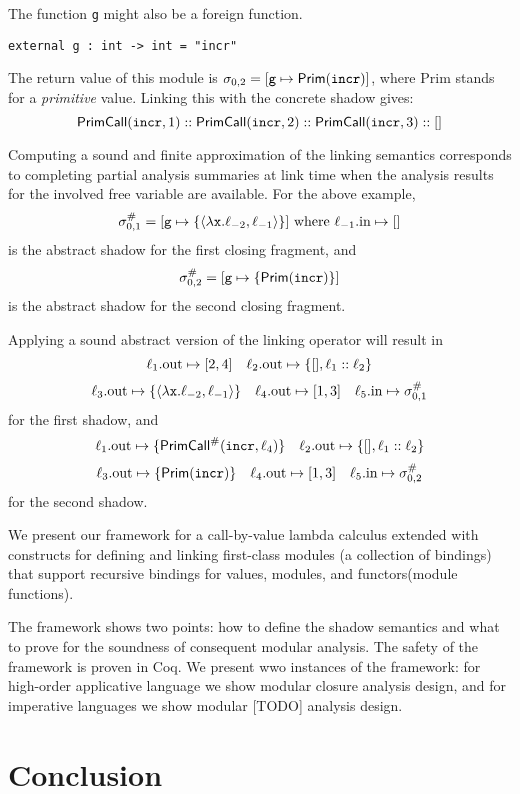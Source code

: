 \documentclass{article}
\begin{document}
The function \texttt{g} might also be a foreign function.
\begin{center}
  \begin{BVerbatim}
external g : int -> int = "incr"
  \end{BVerbatim}
\end{center}
The return value of this module is $\sigma_{0,2}=[\texttt{g}\mapsto\textsf{Prim}(\texttt{incr})]$, where \textsf{Prim} stands for a \emph{primitive} value.
Linking this with the concrete shadow gives:
\[\textsf{PrimCall}(\texttt{incr},1)::\textsf{PrimCall}(\texttt{incr},2)::\textsf{PrimCall}(\texttt{incr},3)::[]\]

Computing a sound and finite approximation of the linking semantics
corresponds to completing partial analysis summaries at link time when
the analysis results for the involved free variable are available. For
the above example,
\[
  {\sigma}^{\#}_{0,1}=[\texttt{g}\mapsto\{\langle\lambda\texttt{x}.\ell_{-2},\ell_{-1}\rangle\}]\text{ where }
  \ell_{-1}.\text{in}\mapsto[]
\]
is the abstract shadow for the first closing fragment, and
\[
  {\sigma}^{\#}_{0,2}=[\texttt{g}\mapsto\{\textsf{Prim}(\texttt{incr})\}]
\]
is the abstract shadow for the second closing fragment.

Applying a sound abstract version of the linking operator will result in
\[
  \ell_1.\text{out}\mapsto[2,4]\quad
  \ell_2.\text{out}\mapsto\{[],\ell_1:: \ell_2\}
\]
\[
  \ell_3.\text{out}\mapsto\{\langle\lambda\texttt{x}.\ell_{-2},\ell_{-1}\rangle\}\quad
  \ell_4.\text{out}\mapsto[1,3]\quad
  \ell_5.\text{in}\mapsto{\sigma}^{\#}_{0,1}
\]
for the first shadow, and
\[
  \ell_1.\text{out}\mapsto\{{\textsf{PrimCall}}^{\#}(\texttt{incr},\ell_4)\}\quad
  \ell_2.\text{out}\mapsto\{[],\ell_1:: \ell_2\}
\]
\[
  \ell_3.\text{out}\mapsto\{\textsf{Prim}(\texttt{incr})\}\quad
  \ell_4.\text{out}\mapsto[1,3]\quad
  \ell_5.\text{in}\mapsto{\sigma}^{\#}_{0,2}
\]
for the second shadow.

We present our framework for a call-by-value lambda calculus extended
with constructs for defining and linking first-class modules (a
collection of bindings) that support recursive bindings for values,
modules, and functors(module functions).

The framework shows two points: how to define the shadow semantics and
what to prove for the soundness of consequent modular analysis. The
safety of the framework is proven in Coq. We present wwo instances of the
framework: for high-order applicative language we show modular
closure analysis design, and for imperative languages we show modular
  [TODO] analysis design.


\clearpage

\clearpage


\section{Conclusion}
\end{document}
